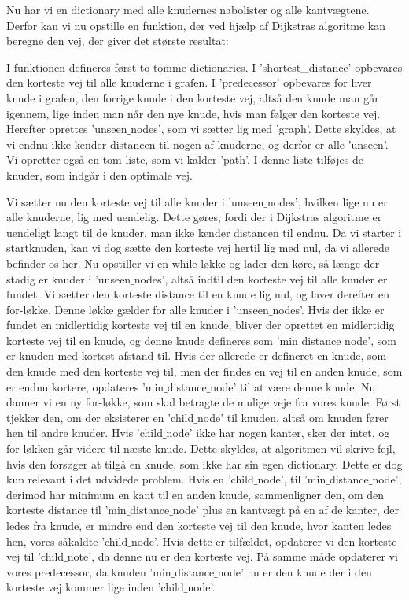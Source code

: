 Nu har vi en dictionary med alle knudernes nabolister og alle kantvægtene. Derfor kan vi nu opstille en funktion, der ved hjælp af Dijkstras algoritme kan beregne den vej, der giver det største resultat:



I funktionen defineres først to tomme dictionaries. I 'shortest\_distance' opbevares den korteste vej til alle knuderne i grafen. I 'predecessor' opbevares for hver knude i grafen, den forrige knude i den korteste vej, altså den knude man går igennem, lige inden man når den nye knude, hvis man følger den korteste vej. Herefter oprettes 'unseen$\_$nodes', som vi sætter lig med 'graph'. Dette skyldes, at vi endnu ikke kender distancen til nogen af knuderne, og derfor er alle 'unseen'. Vi opretter også en tom liste, som vi kalder 'path'. I denne liste tilføjes de knuder, som indgår i den optimale vej.

Vi sætter nu den korteste vej til alle knuder i 'unseen$\_$nodes', hvilken lige nu er alle knuderne, lig med uendelig. Dette gøres, fordi der i Dijkstras algoritme er uendeligt langt til de knuder, man ikke kender distancen til endnu. Da vi starter i startknuden, kan vi dog sætte den korteste vej hertil lig med nul, da vi allerede befinder os her.
Nu opstiller vi en while-løkke og lader den køre, så længe der stadig er knuder i 'unseen$\_$nodes', altså indtil den korteste vej til alle knuder er fundet.
Vi sætter den korteste distance til en knude lig nul, og laver derefter en for-løkke. Denne løkke gælder for alle knuder i 'unseen$\_$nodes'. Hvis der ikke er fundet en midlertidig korteste vej til en knude, bliver der oprettet en midlertidig korteste vej til en knude, og denne knude defineres som 'min$\_$distance$\_$node', som er knuden med kortest afstand til. Hvis der allerede er defineret en knude, som den knude med den korteste vej til, men der findes en vej til en anden knude, som er endnu kortere, opdateres 'min$\_$distance$\_$node' til at være denne knude.
Nu danner vi en ny for-løkke, som skal betragte de mulige veje fra vores knude.
Først tjekker den, om der eksisterer en 'child$\_$node' til knuden, altså om knuden fører hen til andre knuder. Hvis 'child$\_$node' ikke har nogen kanter, sker der intet, og for-løkken går videre til næste knude. Dette skyldes, at algoritmen vil skrive fejl, hvis den forsøger at tilgå en knude, som ikke har sin egen dictionary. Dette er dog kun relevant i det udvidede problem.
Hvis en 'child$\_$node', til  'min$\_$distance$\_$node', derimod har minimum en kant til en anden knude, sammenligner den, om den korteste distance til 'min$\_$distance$\_$node' plus en kantvægt på en af de kanter, der ledes fra knude, er mindre end den korteste vej til den knude, hvor kanten ledes hen, vores såkaldte 'child$\_$node'. Hvis dette er tilfældet, opdaterer vi den korteste vej til 'child$\_$note', da denne nu er den korteste vej. På samme måde opdaterer vi vores predecessor, da knuden 'min$\_$distance$\_$node' nu er den knude der i den korteste vej kommer lige inden 'child$\_$node'.

